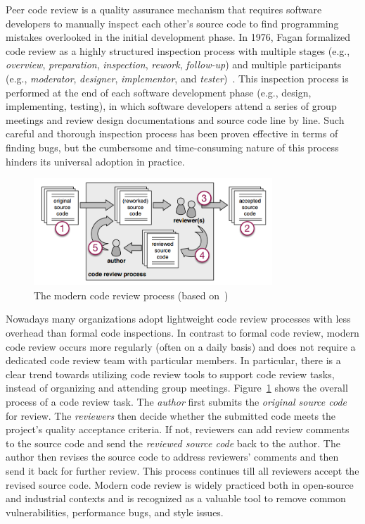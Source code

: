 \documentclass[runningheads,a4paper]{llncs}
\begin{document}
Peer code review is a quality assurance mechanism that requires software developers to manually inspect each other's source code to find programming mistakes overlooked in the initial development phase. In 1976, Fagan formalized code review as a highly structured inspection process with multiple stages (e.g., {\em overview}, {\em preparation}, {\em inspection}, {\em rework}, {\em follow-up}) and multiple participants (e.g., {\em moderator}, {\em designer}, {\em implementor}, and {\em tester})~\cite{fagan2001design}.
This inspection process is performed at the end of each software development phase (e.g., design, implementing, testing), in which software developers attend a series of group meetings and review design documentations and source code line by line. Such careful and thorough inspection process has been proven effective in terms of finding bugs, but the cumbersome and time-consuming nature of this process hinders its universal adoption in practice. 

\begin{figure}[ht]
 \centering
 \includegraphics[width=0.8\textwidth]{images/review-process.png}
 \caption{The modern code review process (based on~\cite{beller2014modern})}
 \label{fig:review-process}
\end{figure}

Nowadays many organizations adopt lightweight code review processes with less overhead than formal code inspections. In contrast to formal code review, modern code review occurs more regularly (often on a daily basis) and does not require a dedicated code review team with particular members. In particular, there is a clear trend towards utilizing code review tools to support code review tasks, instead of organizing and attending group meetings. Figure~\ref{fig:review-process} shows the overall process of a code review task. The {\em author} first submits the {\em original source code} for review. The {\em reviewers} then decide whether the submitted code meets the project's quality acceptance criteria. If not, reviewers can add review comments to the source code and send the {\em reviewed source code} back to the author. The author then revises the source code to address reviewers' comments and then send it back for further review. This process continues till all reviewers accept the revised source code. Modern code review is widely practiced both in open-source and industrial contexts and is recognized as a valuable tool to remove common vulnerabilities, performance bugs, and style issues. 
\end{document}
